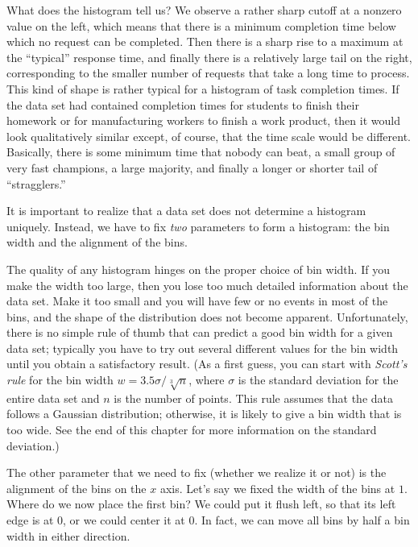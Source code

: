 What does the histogram tell us? We observe a rather sharp cutoff at a
nonzero value on the left, which means that there is a minimum
completion time below which no request can be completed. Then there is
a sharp rise to a maximum at the ``typical'' response time, and
finally there is a relatively large tail on the right, corresponding
to the smaller number of requests that take a long time to process.
This kind of shape is rather typical for a histogram of task
completion times.  If the data set had contained completion times for
students to finish their homework or for manufacturing workers to
finish a work product, then it would look qualitatively similar
except, of course, that the time scale would be different. Basically,
there is some minimum time that nobody can beat, a small group of very
fast champions, a large majority, and finally a longer or shorter tail
of ``stragglers.''

It is important to realize that a data set does not determine a
histogram uniquely. Instead, we have to fix \emph{two} parameters to
form a histogram: the bin width and the alignment of the bins.

The quality of any histogram hinges on the proper choice of bin width.
If you make the width too large, then you lose too much detailed
information about the data set. Make it too small and you will have
few or no events in most of the bins, and the shape of the distribution
does not become apparent. Unfortunately, there is no simple rule of
thumb that can predict a good bin width for a given data set;
typically you have to try out several different values for the bin
width until you obtain a satisfactory result. (As a first guess, you
can start with \emph{Scott's rule} for the bin width $w = 3.5 \sigma /
\sqrt[3]{n}$, where $\sigma$ is the standard deviation for the entire
data set and $n$ is the number of points. This rule assumes that the
data follows a Gaussian distribution; otherwise, it is likely to give
a bin width that is too wide. See the end of this chapter for more
information on the standard deviation.)

The other parameter that we need to fix (whether we realize it or
not) is the alignment of the bins on the $x$ axis. Let's say we fixed
the width of the bins at $1$.  Where do we now place the first bin? We
could put it flush left, so that its left edge is at $0$, or we could
center it at $0$. In fact, we can move all bins by half a bin width
in either direction.

